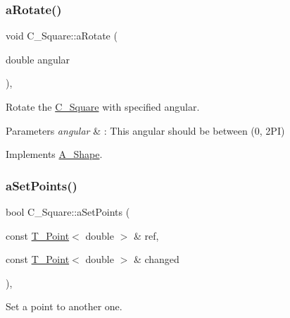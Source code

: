 \mbox{\label{classC__Square_af74175a5e8d61216d68fde18ef9c9481}} 
\subsubsection{\texorpdfstring{a\+Rotate()}{aRotate()}}
{\footnotesize\ttfamily void C\+\_\+\+Square\+::a\+Rotate (\begin{DoxyParamCaption}\item[{double}]{angular }\end{DoxyParamCaption})\hspace{0.3cm}{\ttfamily [override]}, {\ttfamily [virtual]}}



Rotate the \hyperlink{classC__Square}{C\+\_\+\+Square} with specified angular. 


\begin{DoxyParams}{Parameters}
{\em angular} & \+: This angular should be between (0, 2\+PI) \\
\hline
\end{DoxyParams}


Implements \hyperlink{classA__Shape_a25b4e0c34cdb46da5382fe9c7467efaf}{A\+\_\+\+Shape}.

\mbox{\label{classC__Square_a295a170686422b745587a250ebe08a5e}} 
\subsubsection{\texorpdfstring{a\+Set\+Points()}{aSetPoints()}}
{\footnotesize\ttfamily bool C\+\_\+\+Square\+::a\+Set\+Points (\begin{DoxyParamCaption}\item[{const \hyperlink{classT__Point}{T\+\_\+\+Point}$<$ double $>$ \&}]{ref,  }\item[{const \hyperlink{classT__Point}{T\+\_\+\+Point}$<$ double $>$ \&}]{changed }\end{DoxyParamCaption})\hspace{0.3cm}{\ttfamily [override]}, {\ttfamily [virtual]}}



Set a point to another one. 


